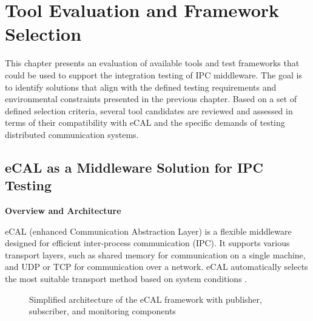 \clearpage
\section{Tool Evaluation and Framework Selection}

This chapter presents an evaluation of available tools and test frameworks that could be used to support the integration testing of IPC middleware. The goal is to identify solutions that align with the defined testing requirements and environmental constraints presented in the previous chapter. Based on a set of defined selection criteria, several tool candidates are reviewed and assessed in terms of their compatibility with eCAL and the specific demands of testing distributed communication systems.

\subsection{eCAL as a Middleware Solution for IPC Testing}

\textbf{Overview and Architecture}

\vspace{0.4em}
eCAL (enhanced Communication Abstraction Layer) is a flexible middleware designed for efficient inter-process communication (IPC). It supports various transport layers, such as shared memory for communication on a single machine, and UDP or TCP for communication over a network. eCAL automatically selects the most suitable transport method based on system conditions \cite{ecal_official_docs}.


\vspace{1em}
\begin{figure}[H]
	\centering
	\caption{Simplified architecture of the eCAL framework with publisher, subscriber, and monitoring components}
	\label{fig:ecal_architecture}
\end{figure}

